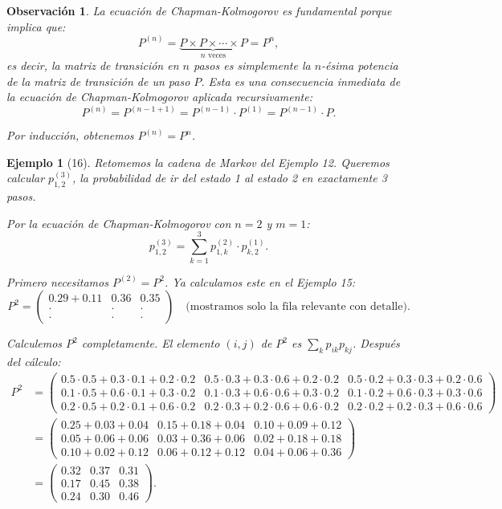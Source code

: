 \documentclass[12pt]{book}
\newtheorem{example}{Ejemplo}[chapter]
\newtheorem{remark}{Observación}[chapter]
\begin{document}
\begin{remark}
La ecuación de Chapman-Kolmogorov es fundamental porque implica que:
\[
P^{(n)} = \underbrace{P \times P \times \cdots \times P}_{n \text{ veces}} = P^n,
\]
es decir, la matriz de transición en $n$ pasos es simplemente la $n$-ésima potencia de la matriz de transición de un paso $P$. Esta es una consecuencia inmediata de la ecuación de Chapman-Kolmogorov aplicada recursivamente:
\[
P^{(n)} = P^{(n-1+1)} = P^{(n-1)} \cdot P^{(1)} = P^{(n-1)} \cdot P.
\]

Por inducción, obtenemos $P^{(n)} = P^n$.
\end{remark}

\begin{example}[16]
Retomemos la cadena de Markov del Ejemplo 12. Queremos calcular $p_{1,2}^{(3)}$, la probabilidad de ir del estado 1 al estado 2 en exactamente 3 pasos.

Por la ecuación de Chapman-Kolmogorov con $n = 2$ y $m = 1$:
\[
p_{1,2}^{(3)} = \sum_{k=1}^{3} p_{1,k}^{(2)} \cdot p_{k,2}^{(1)}.
\]

Primero necesitamos $P^{(2)} = P^2$. Ya calculamos este en el Ejemplo 15:
\[
P^2 = \begin{pmatrix}
0.29 + 0.11 & 0.36 & 0.35 \\
\cdot & \cdot & \cdot \\
\cdot & \cdot & \cdot
\end{pmatrix}
\quad \text{(mostramos solo la fila relevante con detalle)}.
\]

Calculemos $P^2$ completamente. El elemento $(i,j)$ de $P^2$ es $\sum_k p_{ik} p_{kj}$. Después del cálculo:
\begin{align*}
P^2 &= \begin{pmatrix}
0.5 \cdot 0.5 + 0.3 \cdot 0.1 + 0.2 \cdot 0.2 & 0.5 \cdot 0.3 + 0.3 \cdot 0.6 + 0.2 \cdot 0.2 & 0.5 \cdot 0.2 + 0.3 \cdot 0.3 + 0.2 \cdot 0.6 \\
0.1 \cdot 0.5 + 0.6 \cdot 0.1 + 0.3 \cdot 0.2 & 0.1 \cdot 0.3 + 0.6 \cdot 0.6 + 0.3 \cdot 0.2 & 0.1 \cdot 0.2 + 0.6 \cdot 0.3 + 0.3 \cdot 0.6 \\
0.2 \cdot 0.5 + 0.2 \cdot 0.1 + 0.6 \cdot 0.2 & 0.2 \cdot 0.3 + 0.2 \cdot 0.6 + 0.6 \cdot 0.2 & 0.2 \cdot 0.2 + 0.2 \cdot 0.3 + 0.6 \cdot 0.6
\end{pmatrix}\\
&= \begin{pmatrix}
0.25 + 0.03 + 0.04 & 0.15 + 0.18 + 0.04 & 0.10 + 0.09 + 0.12 \\
0.05 + 0.06 + 0.06 & 0.03 + 0.36 + 0.06 & 0.02 + 0.18 + 0.18 \\
0.10 + 0.02 + 0.12 & 0.06 + 0.12 + 0.12 & 0.04 + 0.06 + 0.36
\end{pmatrix}\\
&= \begin{pmatrix}
0.32 & 0.37 & 0.31 \\
0.17 & 0.45 & 0.38 \\
0.24 & 0.30 & 0.46
\end{pmatrix}.
\end{align*}


\end{example}
\end{document}
